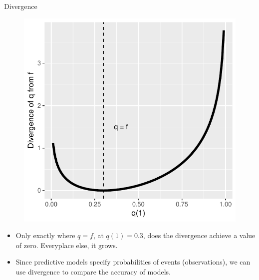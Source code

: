 \documentclass[handout]{beamer}
\begin{document}
\begin{frame}{Divergence}
\scriptsize{

\begin{figure}[h!]
	\centering
	\includegraphics[scale=0.45]{pics/divergence.pdf}
\end{figure}

\begin{itemize}
 \item Only exactly where $q = f$, at $q(1) = 0.3$, does the divergence achieve a value of zero. Everyplace else, it grows.
 
 \item Since predictive models specify probabilities of events (observations), we can use divergence to compare the accuracy of models. 
\end{itemize}


} 
\end{frame}
\end{document}
